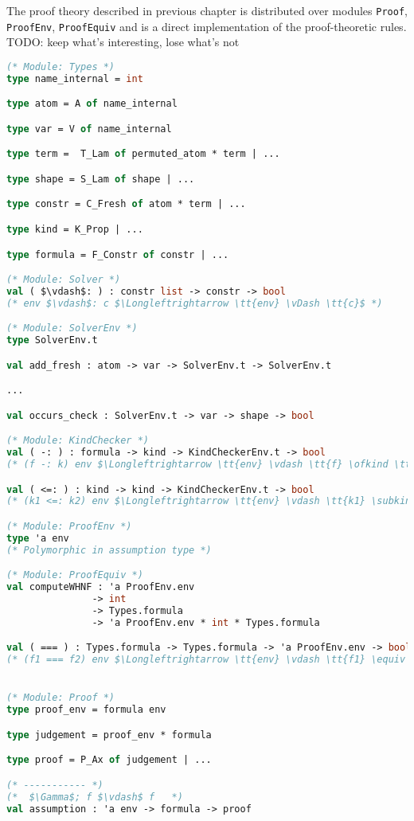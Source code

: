 \documentclass[english, mgr]{iithesis}
\renewcommand{\tt}[1]{\texttt{\small{#1}}}
\begin{document}
The proof theory described in previous chapter is distributed over modules
\tt{Proof}, \tt{ProofEnv}, \tt{ProofEquiv} and is a direct implementation of the proof-theoretic rules.
TODO: keep what's interesting, lose what's not
\begin{lstlisting}[mathescape, language=OCaml]
(* Module: Types *)
type name_internal = int

type atom = A of name_internal

type var = V of name_internal

type term =  T_Lam of permuted_atom * term | ...

type shape = S_Lam of shape | ...

type constr = C_Fresh of atom * term | ...

type kind = K_Prop | ...

type formula = F_Constr of constr | ...

(* Module: Solver *)
val ( $\vdash$: ) : constr list -> constr -> bool
(* env $\vdash$: c $\Longleftrightarrow \tt{env} \vDash \tt{c}$ *)

(* Module: SolverEnv *)
type SolverEnv.t

val add_fresh : atom -> var -> SolverEnv.t -> SolverEnv.t

...

val occurs_check : SolverEnv.t -> var -> shape -> bool

(* Module: KindChecker *)
val ( -: ) : formula -> kind -> KindCheckerEnv.t -> bool
(* (f -: k) env $\Longleftrightarrow \tt{env} \vdash \tt{f} \ofkind \tt{k}$ *)

val ( <=: ) : kind -> kind -> KindCheckerEnv.t -> bool
(* (k1 <=: k2) env $\Longleftrightarrow \tt{env} \vdash \tt{k1} \subkind \tt{k2}$ *)

(* Module: ProofEnv *)
type 'a env
(* Polymorphic in assumption type *)

(* Module: ProofEquiv *)
val computeWHNF : 'a ProofEnv.env
               -> int
               -> Types.formula
               -> 'a ProofEnv.env * int * Types.formula

val ( === ) : Types.formula -> Types.formula -> 'a ProofEnv.env -> bool
(* (f1 === f2) env $\Longleftrightarrow \tt{env} \vdash \tt{f1} \equiv \tt{f2}$ *)


(* Module: Proof *)
type proof_env = formula env

type judgement = proof_env * formula

type proof = P_Ax of judgement | ...

(* ----------- *)
(*  $\Gamma$; f $\vdash$ f   *)
val assumption : 'a env -> formula -> proof


\end{lstlisting}
\end{document}
